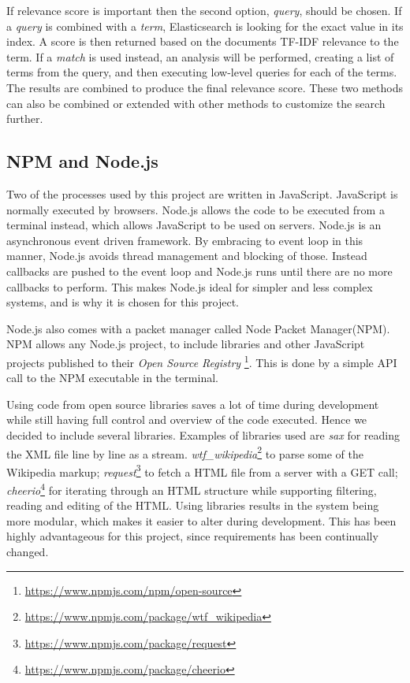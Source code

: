 If relevance score is important then the second option, \textit{query}, should be chosen. If a \textit{query} is combined with a \textit{term}, Elasticsearch is looking for the exact value in its index. A score is then returned based on the documents TF-IDF relevance to the term. If a \textit{match} is used instead, an analysis will be performed, creating a list of terms from the query, and then executing low-level queries for each of the terms. The results are combined to produce the final relevance score. These two methods can also be combined or extended with other methods to customize the search further.


\subsection{NPM and Node.js}
Two of the processes used by this project are written in JavaScript. JavaScript is normally executed by browsers. Node.js\cite{node} allows the code to be executed from a terminal instead, which allows JavaScript to be used on servers.  Node.js is an asynchronous event driven framework. By embracing to event loop in this manner, Node.js avoids thread management and blocking of those. Instead callbacks are pushed to the event loop and Node.js runs until there are no more callbacks to perform. This makes Node.js ideal for simpler and less complex systems, and is why it is chosen for this project.

Node.js also comes with a packet manager called Node Packet Manager(NPM). NPM allows any Node.js project, to include libraries and other JavaScript projects published to their \textit{Open Source Registry} \footnote{\url{https://www.npmjs.com/npm/open-source}}. This is done by a simple API call to the NPM executable in the terminal.

Using code from open source libraries saves a lot of time during development while still having full control and overview of the code executed. Hence we decided to include several libraries. Examples of libraries used are \textit{sax} for reading the XML file line by line as a stream.  \textit{wtf\_wikipedia}\footnote{\url{https://www.npmjs.com/package/wtf_wikipedia}} to parse some of the Wikipedia markup;  \textit{request}\footnote{\url{https://www.npmjs.com/package/request}} to fetch a HTML file from a server with a GET call;  \textit{cheerio}\footnote{\url{https://www.npmjs.com/package/cheerio}} for iterating through an HTML structure while supporting filtering, reading and editing of the HTML. Using libraries results in the system being more modular, which makes it easier to alter during development. This has been highly advantageous for this project, since requirements has been continually changed. 

